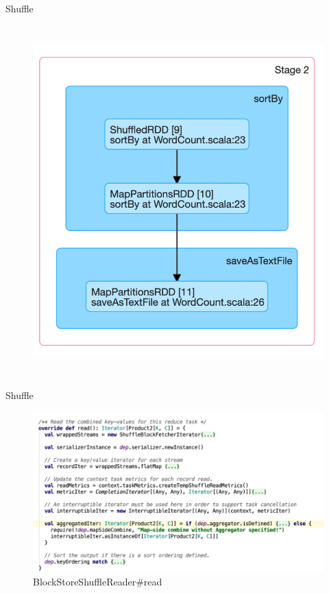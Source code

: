 \begin{frame}[plain,t]{Shuffle}
\begin{columns}[c]
\begin{figure}
			\includegraphics[width=1\linewidth]{images/p009}
			\label{fig:p009}
		\end{figure}
	\end{columns}
	
\end{frame}
\begin{frame}[plain,t]{Shuffle} %
	 \\  \vspace{2ex}
	\begin{figure}
		\centering
		\includegraphics[width=1\linewidth]{images/shufflereader001}
		\caption{BlockStoreShuffleReader\#read}
		\label{fig:shufflereader001}
	\end{figure}
	
\end{frame}
